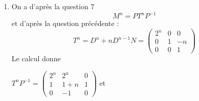 \documentclass[a4paper, 11pt,reqno]{article}
\begin{document}
\begin{correction}
\begin{enumerate}
\item On a d'après la question 7 
$$M^n = P T^n P^{-1}$$
et d'après la question précédente : 
$$T^n = D^{n} + n D^{n-1} N  =\left(\begin{array}{ccc}  
2^n&0&0 \\
0 &1&-n \\
0&0&1 
\end{array}\right)$$
Le calcul donne 

$T^n P^{-1} = \left(\begin{array}{ccc}  
2^n&2^n&0 \\
1 &1+n&1 \\
0&-1&0 
\end{array}\right)$
et 




\end{enumerate}
\end{correction}
\end{document}
